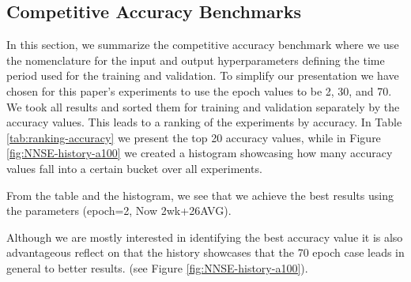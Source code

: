 \documentclass[utf8]{FrontiersinVancouver} %
\begin{document}
\subsection{Competitive Accuracy Benchmarks}

In this section, we summarize the competitive accuracy benchmark where
we use the nomenclature for the input and output hyperparameters
defining the time period used for the training and validation.  To
simplify our presentation we have chosen for this paper's experiments
to use the epoch values to be 2, 30, and 70. We took all results and
sorted them for training and validation separately by the accuracy
values. This leads to a ranking of the experiments by accuracy. In
Table \ref{tab:ranking-accuracy} we present the top 20 accuracy
values, while in Figure \ref{fig:NNSE-history-a100} we created a
histogram showcasing how many accuracy values fall into a certain
bucket over all experiments.

From the table and the histogram, we see that we achieve the best
results using the parameters (epoch=2, Now 2wk+26AVG).

Although we are mostly interested in identifying the best accuracy
value it is also advantageous reflect on that the history showcases
that the 70 epoch case leads in general to better results.  (see
Figure \ref{fig:NNSE-history-a100}).
\end{document}
